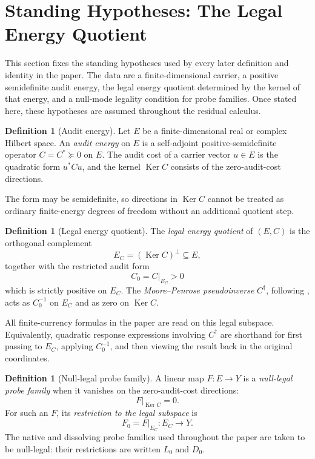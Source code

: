 \documentclass[11pt]{article}
\DeclareMathOperator{\Ker}{Ker}
\theoremstyle{definition}
\newtheorem{definition}[theorem]{Definition}
\begin{document}
 \section{Standing Hypotheses: The Legal Energy Quotient}
\label{sec:setup}

This section fixes the standing hypotheses used by every later definition and
identity in the paper.  The data are a finite-dimensional carrier, a positive
semidefinite audit energy, the legal energy quotient determined by the kernel
of that energy, and a null-mode legality condition for probe families.  Once
stated here, these hypotheses are assumed throughout the residual calculus.

\begin{definition}[Audit energy]\label{def:xi:audit-energy}
Let \(E\) be a finite-dimensional real or complex Hilbert space.  An
\emph{audit energy} on \(E\) is a self-adjoint positive-semidefinite operator
\(C=C^*\succeq 0\) on \(E\).  The audit cost of a carrier vector \(u\in E\) is
the quadratic form \(u^*Cu\), and the kernel \(\Ker C\) consists of the
zero-audit-cost directions.
\end{definition}

The form may be semidefinite, so directions in \(\Ker C\) cannot be treated as
ordinary finite-energy degrees of freedom without an additional quotient step.

\begin{definition}[Legal energy quotient]\label{def:xi:legal-energy-quotient}
The \emph{legal energy quotient} of \((E,C)\) is the orthogonal complement
\[
  E_C=(\Ker C)^\perp\subseteq E,
\]
together with the restricted audit form
\[
  C_0=C|_{E_C}>0
\]
which is strictly positive on \(E_C\).  The \emph{Moore--Penrose pseudoinverse}
\(C^\dagger\), following
\citet{Penrose1955GeneralizedInverse,BenIsraelGreville2003GeneralizedInverses},
acts as \(C_0^{-1}\) on \(E_C\) and as zero on \(\Ker C\).
\end{definition}

All finite-currency formulas in the paper are read on this legal subspace.
Equivalently, quadratic response expressions involving \(C^\dagger\) are
shorthand for first passing to \(E_C\), applying \(C_0^{-1}\), and then viewing
the result back in the original coordinates.

\begin{definition}[Null-legal probe family]\label{def:xi:null-legal-probe-family}
A linear map \(F\colon E\to Y\) is a \emph{null-legal probe family} when it
vanishes on the zero-audit-cost directions:
\[
  F|_{\Ker C}=0.
\]
For such an \(F\), its \emph{restriction to the legal subspace} is
\[
  F_0=F|_{E_C}\colon E_C\to Y.
\]
The native and dissolving probe families used throughout the paper are taken to
be null-legal: their restrictions are written \(L_0\) and \(D_0\).
\end{definition}
\end{document}
